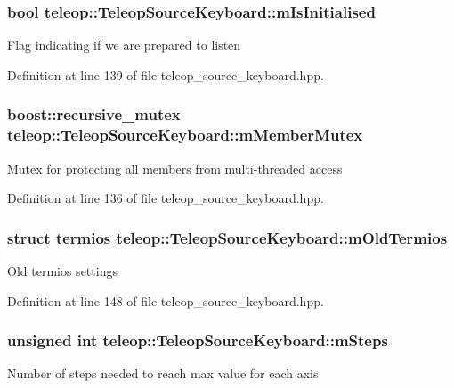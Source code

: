 \subsubsection[{mIsInitialised}]{\setlength{\rightskip}{0pt plus 5cm}bool {\bf teleop::TeleopSourceKeyboard::mIsInitialised}\hspace{0.3cm}{\ttfamily  [private]}}\label{classteleop_1_1TeleopSourceKeyboard_a83ec820735c831ac44344094548a7ccf}
Flag indicating if we are prepared to listen 

Definition at line 139 of file teleop\_\-source\_\-keyboard.hpp.

\subsubsection[{mMemberMutex}]{\setlength{\rightskip}{0pt plus 5cm}boost::recursive\_\-mutex {\bf teleop::TeleopSourceKeyboard::mMemberMutex}\hspace{0.3cm}{\ttfamily  [private]}}\label{classteleop_1_1TeleopSourceKeyboard_a16e92fa0ca9ba2c2338c7a32778d482e}
Mutex for protecting all members from multi-\/threaded access 

Definition at line 136 of file teleop\_\-source\_\-keyboard.hpp.

\subsubsection[{mOldTermios}]{\setlength{\rightskip}{0pt plus 5cm}struct termios {\bf teleop::TeleopSourceKeyboard::mOldTermios}\hspace{0.3cm}{\ttfamily  [private]}}\label{classteleop_1_1TeleopSourceKeyboard_a9eae880b1b2c83e02d9aa102adc5fe47}
Old termios settings 

Definition at line 148 of file teleop\_\-source\_\-keyboard.hpp.

\subsubsection[{mSteps}]{\setlength{\rightskip}{0pt plus 5cm}unsigned int {\bf teleop::TeleopSourceKeyboard::mSteps}\hspace{0.3cm}{\ttfamily  [private]}}\label{classteleop_1_1TeleopSourceKeyboard_a98fc7a02e157f4fa586f32731a93bb0a}
Number of steps needed to reach max value for each axis 

